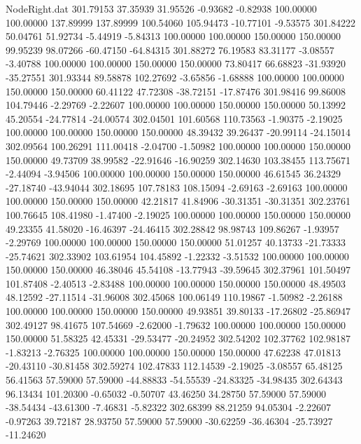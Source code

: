 \begin{filecontents}{NodeRight.dat}
 301.79153   37.35939   31.95526    -0.93682   -0.82938  100.00000  100.00000  137.89999  137.89999  100.54060  105.94473  -10.77101   -9.53575
 301.84222   50.04761   51.92734    -5.44919   -5.84313  100.00000  100.00000  150.00000  150.00000   99.95239   98.07266  -60.47150  -64.84315
 301.88272   76.19583   83.31177    -3.08557   -3.40788  100.00000  100.00000  150.00000  150.00000   73.80417   66.68823  -31.93920  -35.27551
 301.93344   89.58878  102.27692    -3.65856   -1.68888  100.00000  100.00000  150.00000  150.00000   60.41122   47.72308  -38.72151  -17.87476
 301.98416   99.86008  104.79446    -2.29769   -2.22607  100.00000  100.00000  150.00000  150.00000   50.13992   45.20554  -24.77814  -24.00574
 302.04501  101.60568  110.73563    -1.90375   -2.19025  100.00000  100.00000  150.00000  150.00000   48.39432   39.26437  -20.99114  -24.15014
 302.09564  100.26291  111.00418    -2.04700   -1.50982  100.00000  100.00000  150.00000  150.00000   49.73709   38.99582  -22.91646  -16.90259
 302.14630  103.38455  113.75671    -2.44094   -3.94506  100.00000  100.00000  150.00000  150.00000   46.61545   36.24329  -27.18740  -43.94044
 302.18695  107.78183  108.15094    -2.69163   -2.69163  100.00000  100.00000  150.00000  150.00000   42.21817   41.84906  -30.31351  -30.31351
 302.23761  100.76645  108.41980    -1.47400   -2.19025  100.00000  100.00000  150.00000  150.00000   49.23355   41.58020  -16.46397  -24.46415
 302.28842   98.98743  109.86267    -1.93957   -2.29769  100.00000  100.00000  150.00000  150.00000   51.01257   40.13733  -21.73333  -25.74621
 302.33902  103.61954  104.45892    -1.22332   -3.51532  100.00000  100.00000  150.00000  150.00000   46.38046   45.54108  -13.77943  -39.59645
 302.37961  101.50497  101.87408    -2.40513   -2.83488  100.00000  100.00000  150.00000  150.00000   48.49503   48.12592  -27.11514  -31.96008
 302.45068  100.06149  110.19867    -1.50982   -2.26188  100.00000  100.00000  150.00000  150.00000   49.93851   39.80133  -17.26802  -25.86947
 302.49127   98.41675  107.54669    -2.62000   -1.79632  100.00000  100.00000  150.00000  150.00000   51.58325   42.45331  -29.53477  -20.24952
 302.54202  102.37762  102.98187    -1.83213   -2.76325  100.00000  100.00000  150.00000  150.00000   47.62238   47.01813  -20.43110  -30.81458
 302.59274  102.47833  112.14539    -2.19025   -3.08557   65.48125   56.41563   57.59000   57.59000  -44.88833  -54.55539  -24.83325  -34.98435
 302.64343   96.13434  101.20300    -0.65032   -0.50707   43.46250   34.28750   57.59000   57.59000  -38.54434  -43.61300   -7.46831   -5.82322
 302.68399   88.21259   94.05304    -2.22607   -0.97263   39.72187   28.93750   57.59000   57.59000  -30.62259  -36.46304  -25.73927  -11.24620

\end{filecontents}
